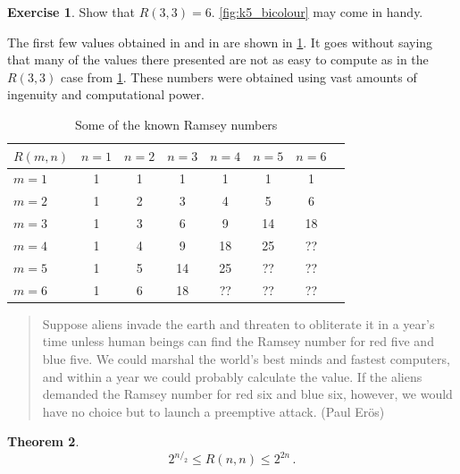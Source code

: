 \documentclass[12pt]{amsart}
\theoremstyle{definition}
\newtheorem{thm}{Theorem}[section]
\newtheorem{exe}[thm]{Exercise}
\begin{document}
\begin{exe}\label{exe:r33}
Show that $R(3, 3) = 6$.
\cref{fig:k5_bicolour} may come in handy.
\end{exe}


The first few values obtained in \cite{chachamis2018ramsey} and in \cite{graver1968some} are shown in \cref{tab:ramsey_nums}.
It goes without saying that many of the values there presented are not as easy to compute as in the $R(3, 3)$ case from \cref{exe:r33}.
These numbers were obtained using vast amounts of ingenuity and computational power.

\begin{table}
\begin{tabular}{l|| c | c | c | c | c | c | c}
$R(m, n)$& $n = 1 $ & $n = 2 $ &$n = 3 $ &$n = 4 $ &$n = 5 $ & $n = 6$\\
\hline
$ m = 1 $& 1 & 1 & 1 & 1 & 1 & 1\\
$ m = 2 $& 1 & 2 & 3 & 4 & 5 & 6\\
$ m = 3 $& 1 & 3 & 6 & 9 & 14 & 18\\
$ m = 4 $& 1 & 4 & 9 & 18 & 25 & ??\\
$ m = 5 $& 1 & 5 & 14 & 25 & ?? & ??\\
$ m = 6 $& 1 & 6 & 18 & ?? & ?? & ??
\end{tabular}
\caption{Some of the known Ramsey numbers\label{tab:ramsey_nums}}
\end{table}


\begin{quote}
Suppose aliens invade the earth and threaten to obliterate it in a year's time unless human beings can find the Ramsey number for red five and blue five. We could marshal the world's best minds and fastest computers, and within a year we could probably calculate the value. If the aliens demanded the Ramsey number for red six and blue six, however, we would have no choice but to launch a preemptive attack.
\hfill (Paul Er\"os)
\end{quote}

\begin{thm}
$$2^{n/_2} \leq R(n, n) \leq 2^{2n}\, . $$

\end{thm}
\end{document}
